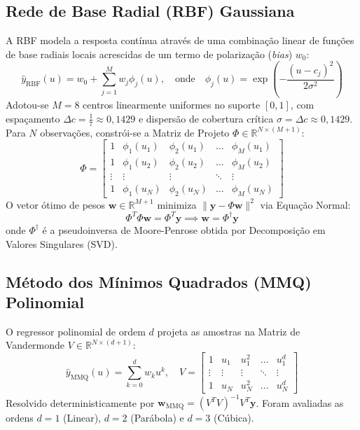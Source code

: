 \documentclass[12pt,a4paper]{article}
\begin{document}
\subsection{Rede de Base Radial (RBF) Gaussiana}
A RBF modela a resposta contínua através de uma combinação linear de funções de base radiais locais acrescidas de um termo de polarização (\textit{bias}) $w_0$:
\begin{equation}
\hat{y}_{\text{RBF}}(u) = w_0 + \sum_{j=1}^{M} w_j \phi_j(u), \quad \text{onde} \quad \phi_j(u) = \exp\left( -\frac{(u - c_j)^2}{2\sigma^2} \right)
\end{equation}
Adotou-se $M=8$ centros linearmente uniformes no suporte $[0, 1]$, com espaçamento $\Delta c = \frac{1}{7} \approx 0{,}1429$ e dispersão de cobertura crítica $\sigma = \Delta c \approx 0{,}1429$.
Para $N$ observações, constrói-se a Matriz de Projeto $\Phi \in \mathbb{R}^{N \times (M+1)}$:
\begin{equation}
\Phi = \begin{bmatrix}
1 & \phi_1(u_1) & \phi_2(u_1) & \dots & \phi_M(u_1) \\
1 & \phi_1(u_2) & \phi_2(u_2) & \dots & \phi_M(u_2) \\
\vdots & \vdots & \vdots & \ddots & \vdots \\
1 & \phi_1(u_N) & \phi_2(u_N) & \dots & \phi_M(u_N)
\end{bmatrix}
\end{equation}
O vetor ótimo de pesos $\mathbf{w} \in \mathbb{R}^{M+1}$ minimiza $\|\mathbf{y} - \Phi \mathbf{w}\|^2$ via Equação Normal:
\begin{equation}
\Phi^T \Phi \mathbf{w} = \Phi^T \mathbf{y} \implies \mathbf{w} = \Phi^\dagger \mathbf{y}
\end{equation}
onde $\Phi^\dagger$ é a pseudoinversa de Moore-Penrose obtida por Decomposição em Valores Singulares (SVD).

\subsection{Método dos Mínimos Quadrados (MMQ) Polinomial}
O regressor polinomial de ordem $d$ projeta as amostras na Matriz de Vandermonde $V \in \mathbb{R}^{N \times (d+1)}$:
\begin{equation}
\hat{y}_{\text{MMQ}}(u) = \sum_{k=0}^{d} w_k u^k, \quad 
V = \begin{bmatrix}
1 & u_1 & u_1^2 & \dots & u_1^d \\
\vdots & \vdots & \vdots & \ddots & \vdots \\
1 & u_N & u_N^2 & \dots & u_N^d
\end{bmatrix}
\end{equation}
Resolvido deterministicamente por $\mathbf{w}_{\text{MMQ}} = (V^T V)^{-1} V^T \mathbf{y}$. Foram avaliadas as ordens $d=1$ (Linear), $d=2$ (Parábola) e $d=3$ (Cúbica).
\end{document}
